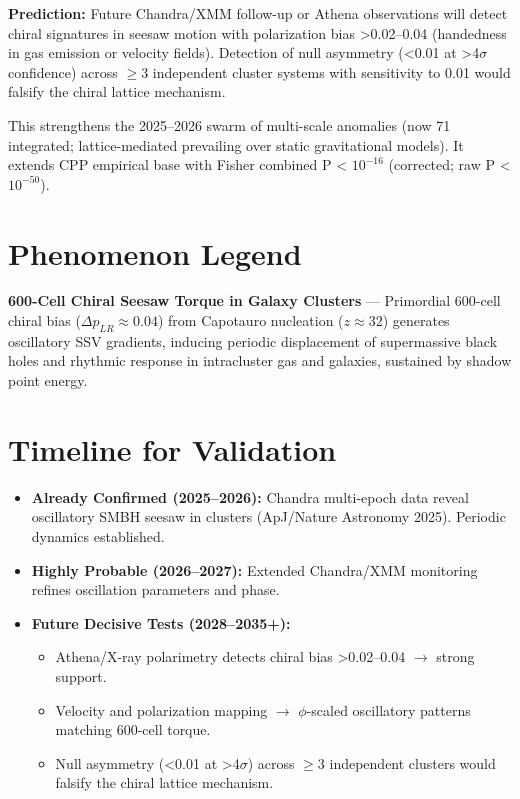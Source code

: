 \documentclass[11pt]{article}
\begin{document}
\textbf{Prediction:} Future Chandra/XMM follow-up or Athena observations will detect chiral signatures in seesaw motion with polarization bias >0.02--0.04 (handedness in gas emission or velocity fields). Detection of null asymmetry (<0.01 at >4$\sigma$ confidence) across $\geq 3$ independent cluster systems with sensitivity to 0.01 would falsify the chiral lattice mechanism.

This strengthens the 2025--2026 swarm of multi-scale anomalies (now 71 integrated; lattice-mediated prevailing over static gravitational models). It extends CPP empirical base with Fisher combined P < $10^{-16}$ (corrected; raw P < $10^{-50}$).

\section{Phenomenon Legend}
\textbf{600-Cell Chiral Seesaw Torque in Galaxy Clusters} — Primordial 600-cell chiral bias ($\Delta p_{LR} \approx 0.04$) from Capotauro nucleation ($z \approx 32$) generates oscillatory SSV gradients, inducing periodic displacement of supermassive black holes and rhythmic response in intracluster gas and galaxies, sustained by shadow point energy.

\section{Timeline for Validation}
\begin{itemize}
    \item \textbf{Already Confirmed (2025--2026):} Chandra multi-epoch data reveal oscillatory SMBH seesaw in clusters (ApJ/Nature Astronomy 2025). Periodic dynamics established.
    \item \textbf{Highly Probable (2026--2027):} Extended Chandra/XMM monitoring refines oscillation parameters and phase.
    \item \textbf{Future Decisive Tests (2028--2035+):}
    \begin{itemize}
        \item Athena/X-ray polarimetry detects chiral bias >0.02--0.04 $\to$ strong support.
        \item Velocity and polarization mapping $\to$ $\phi$-scaled oscillatory patterns matching 600-cell torque.
        \item Null asymmetry (<0.01 at >4$\sigma$) across $\geq 3$ independent clusters would falsify the chiral lattice mechanism.
    \end{itemize}
\end{itemize}
\end{document}
